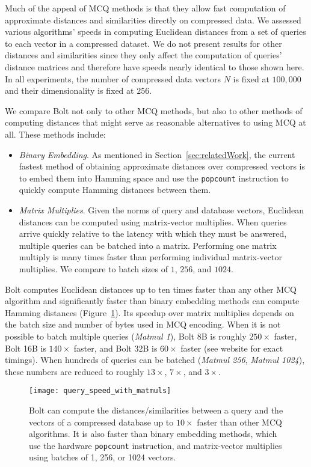 Much of the appeal of MCQ methods is that they allow fast computation of approximate distances and similarities directly on compressed data. We assessed various algorithms' speeds in computing Euclidean distances from a set of queries to each vector in a compressed dataset. We do not present results for other distances and similarities since they only affect the computation of queries' distance matrices and therefore have speeds nearly identical to those shown here. In all experiments, the number of compressed data vectors $N$ is fixed at $100,000$ and their dimensionality is fixed at $256$.

We compare Bolt not only to other MCQ methods, but also to other methods of computing distances that might serve as reasonable alternatives to using MCQ at all. These methods include:
\begin{itemize}[leftmargin=4mm]
    \item \textit{Binary Embedding}. As mentioned in Section~\ref{sec:relatedWork}, the current fastest method of obtaining approximate distances over compressed vectors is to embed them into Hamming space and use the \texttt{popcount} instruction to quickly compute Hamming distances between them.
    \item \textit{Matrix Multiplies}. Given the norms of query and database vectors, Euclidean distances can be computed using matrix-vector multiplies. When queries arrive quickly relative to the latency with which they must be answered, multiple queries can be batched into a matrix. Performing one matrix multiply is many times faster than performing individual matrix-vector multiplies. We compare to batch sizes of $1$, $256$, and $1024$.
\end{itemize}

Bolt computes Euclidean distances up to ten times faster than any other MCQ algorithm and significantly faster than binary embedding methods can compute Hamming distances (Figure~\ref{fig:query_speeds}). Its speedup over matrix multiplies depends on the batch size and number of bytes used in MCQ encoding. When it is not possible to batch multiple queries (\textit{Matmul 1}), Bolt 8B is roughly $250\times$ faster, Bolt 16B is $140\times$ faster, and Bolt 32B is $60\times$ faster (see website for exact timings). When hundreds of queries can be batched (\textit{Matmul 256}, \textit{Matmul 1024}), these numbers are reduced to roughly $13\times$, $7\times$, and $3\times$.

\vspace{-2mm}
\begin{figure}[h]
\begin{center}
\texttt{[image: query\_speed\_with\_matmuls]}
\vspace*{-3mm}
\caption{Bolt can compute the distances/similarities between a query and the vectors of a compressed database up to $10\times$ faster than other MCQ algorithms. It is also faster than binary embedding methods, which use the hardware \texttt{popcount} instruction, and matrix-vector multiplies using batches of 1, 256, or 1024 vectors.}
\label{fig:query_speeds}
\end{center}
\end{figure}

